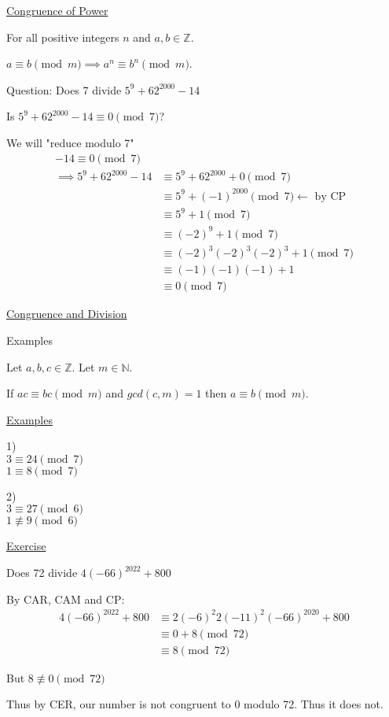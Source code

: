 \documentclass{article}
\begin{document}
\underline{Congruence of Power}

For all positive integers $n$ and $a,b \in \mathbb{Z}$. 

$a \equiv b \pmod{m} \implies a^n \equiv b^n \pmod{m}$.

Question: Does 7 divide $5^9 + 62^{2000} - 14$

Is $5^9 + 62^{2000} - 14 \equiv 0 \pmod{7}$?

We will "reduce modulo 7"
\begin{align*}
    -14 \equiv 0 \pmod{7} \\
    \implies 5^9 + 62^{2000}-14 &\equiv 5^9 + 62^{2000} + 0 \pmod{7} \\
    &\equiv 5^9 + (-1)^{2000} \pmod{7} \leftarrow \text{ by CP} \\
    &\equiv 5^9 + 1 \pmod{7} \\
    &\equiv (-2)^9 + 1 \pmod{7} \\
    &\equiv (-2)^3(-2)^3(-2)^3 + 1 \pmod{7}\\
    &\equiv (-1)(-1)(-1) + 1 \\
    &\equiv 0 \pmod{7}
\end{align*}

\underline{Congruence and Division}

Examples

Let $a,b,c \in \mathbb{Z}$. Let $m \in \mathbb{N}$. 

If $ac \equiv bc \pmod{m}$ and $gcd(c,m)=1$ then $a \equiv b \pmod{m}$.

\underline{Examples}

1) \\
$3 \equiv 24 \pmod{7}$\\
$1 \equiv 8 \pmod{7}$

2)\\
$3 \equiv 27 \pmod{6}$\\
$1 \not\equiv 9 \pmod{6}$

\underline{Exercise}

Does 72 divide $4(-66)^{2022} + 800$

By CAR, CAM and CP:
\begin{align*}
    4(-66)^{2022} + 800 &\equiv 2(-6)^2 2(-11)^2 (-66)^{2020} + 800\\
    &\equiv 0 + 8 \pmod{72} \\
    &\equiv 8 \pmod{72}
\end{align*}

But $8 \not\equiv 0 \pmod{72}$

Thus by CER, our number is not congruent to 0 modulo 72. Thus it does not. 
\end{document}
